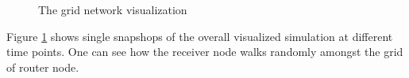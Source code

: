 \begin{figure}
{}\hfill{}

\hfill{}\hfill{}\hfill{}

\caption{\label{fig:The-grid-network}The grid network visualization}



\end{figure}


Figure \ref{fig:The-grid-network} shows single snapshops of the overall
visualized simulation at different time points. One can see how the
receiver node walks randomly amongst the grid of router node.
